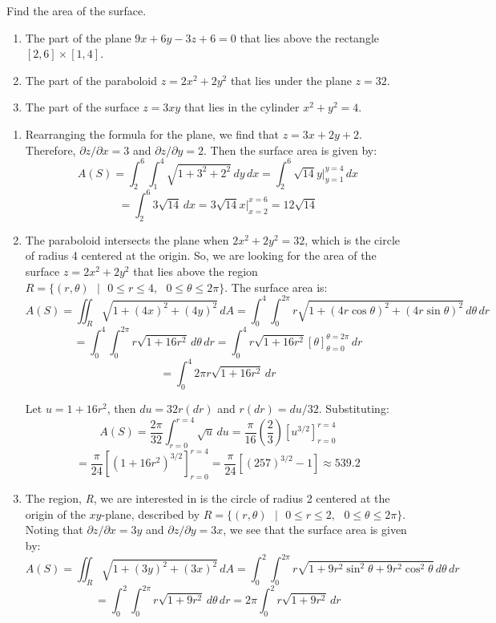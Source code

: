 \begin{Exercise}[title = {Surface Area of Two-Variable Functions}, label = 
surface]
Find the area of the surface.
\begin{enumerate}
\item The part of the plane $9x + 6y - 3z + 6 = 0$ that lies above the 
rectangle $\left[2, 6 \right] \times \left[1, 4 \right]$.
\item The part of the paraboloid $z = 2x^2 + 2y^2$ that lies 
under the plane $z = 32$. 
\item The part of the surface $z = 3xy$ that lies in the cylinder $x^2 + y^2 
= 4$.
\end{enumerate}
\end{Exercise}

\begin{Answer}[ref = surface]
\begin{enumerate}
\item Rearranging the formula for the plane, we find that $z = 3x + 2y + 2$. Therefore, $\partial z / \partial x = 3$ and $\partial z / \partial y = 2$. 
Then the surface area is given by:
$$A(S) = \int_2^6 \int_1^4 \sqrt{1 + 3^2 + 2^2}\,dy\,dx = \int_2^6 \sqrt{14}y|_
{y = 1}^{y = 4}\,dx$$
$$= \int_2^6 3\sqrt{14}\,dx = 3\sqrt{14}x|_{x = 2}^{x = 6} = 12\sqrt{14}$$
\item The paraboloid intersects the plane when $2x^2 + 2y^2 = 32$, which is the
circle of radius 4 centered at the origin. So, we are looking for the area of 
the surface $z = 2x^2 + 2y^2$ that lies above the region $\textit{R} = \{(r, 
\theta)\text{ }|\text{ }0 \leq r \leq 4,\text{ } 0 \leq \theta \leq 2\pi \}$. 
The surface area is:
$$A(S) = \iint_{\textit{R}} \sqrt{1 + \left(4x \right)^2 + \left( 4y \right)^2}
\,dA = \int_0^4 \int_0^{2\pi} r \sqrt{1 + \left(4 r \cos{\theta} \right)^2 + 
\left( 4 r \sin{\theta} \right)^2}\,d\theta\,dr$$
$$= \int_0^4 \int_0^{2\pi} r \sqrt{1 + 16r^2}\,d\theta\,dr = \int_0^4 r \sqrt{
1 + 16r^2} \left[\theta \right]_{\theta = 0}^{\theta = 2\pi}\,dr$$
$$= \int_0^4 2\pi r \sqrt{1 + 16r^2}\,dr$$

Let $u = 1 + 16r^2$, then $du = 32r (dr)$ and $r(dr) = du/32$. Substituting:
$$A(S) = \frac{2\pi}{32} \int_{r = 0}^{r = 4} \sqrt{u}\,du = \frac{\pi}{16} 
\left( \frac{2}{3} \right) \left[u^{3/2} \right]_{r = 0}^{r = 4}$$
$$= \frac{\pi}{24} \left[ \left(1 + 16r^2 \right)^{3/2} \right]_{r = 0}^{r = 4}
= \frac{\pi}{24} \left[ \left(257 \right)^{3/2} - 1\right] \approx 539.2$$

\item The region, \textit{R}, we are interested in is the circle of radius 2 
centered at the origin of the $xy$-plane, described by $\textit{R} = \{(r, 
\theta)\text{ }|\text{ }0 \leq r \leq 2,\text{ }0 \leq \theta \leq 2\pi \}$. 
Noting that $\partial z / \partial x = 3y$ and $\partial z / \partial y = 3x$, 
we see that the surface area is given by:
$$A(S) = \iint_{\textit{R}} \sqrt{1 + \left(3y \right)^2 + \left( 3x \right)^2}
\,dA = \int_0^2 \int_0^{2\pi} r \sqrt{1 + 9r^2\sin^2{\theta} + 9r^2\cos^2{
\theta}}\,d\theta\,dr$$
$$= \int_0^2 \int_0^{2\pi} r \sqrt{1 + 9r^2}\,d\theta\,dr = 2\pi \int_0^2 r 
\sqrt{1 + 9r^2}\,dr$$


\end{enumerate}
\end{Answer}
